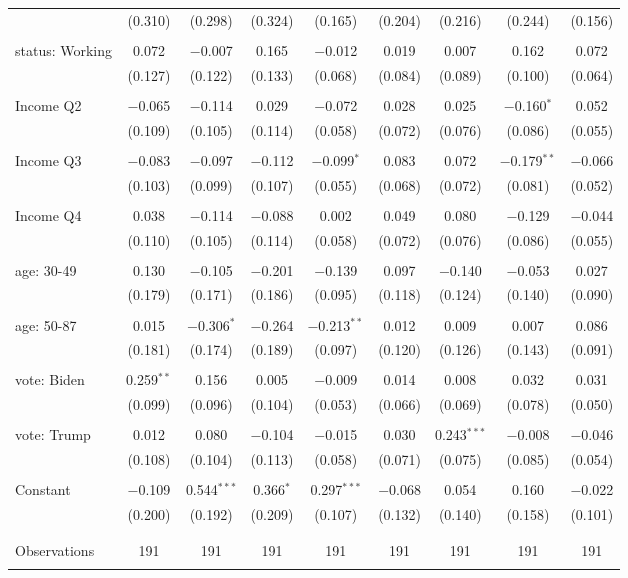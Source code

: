 \begin{tabular}{@{\extracolsep{5pt}}lcccccccc}
  & (0.310) & (0.298) & (0.324) & (0.165) & (0.204) & (0.216) & (0.244) & (0.156) \\ 
  & & & & & & & & \\ 
 status: Working & 0.072 & $-$0.007 & 0.165 & $-$0.012 & 0.019 & 0.007 & 0.162 & 0.072 \\ 
  & (0.127) & (0.122) & (0.133) & (0.068) & (0.084) & (0.089) & (0.100) & (0.064) \\ 
  & & & & & & & & \\ 
 Income Q2 & $-$0.065 & $-$0.114 & 0.029 & $-$0.072 & 0.028 & 0.025 & $-$0.160$^{*}$ & 0.052 \\ 
  & (0.109) & (0.105) & (0.114) & (0.058) & (0.072) & (0.076) & (0.086) & (0.055) \\ 
  & & & & & & & & \\ 
 Income Q3 & $-$0.083 & $-$0.097 & $-$0.112 & $-$0.099$^{*}$ & 0.083 & 0.072 & $-$0.179$^{**}$ & $-$0.066 \\ 
  & (0.103) & (0.099) & (0.107) & (0.055) & (0.068) & (0.072) & (0.081) & (0.052) \\ 
  & & & & & & & & \\ 
 Income Q4 & 0.038 & $-$0.114 & $-$0.088 & 0.002 & 0.049 & 0.080 & $-$0.129 & $-$0.044 \\ 
  & (0.110) & (0.105) & (0.114) & (0.058) & (0.072) & (0.076) & (0.086) & (0.055) \\ 
  & & & & & & & & \\ 
 age: 30-49 & 0.130 & $-$0.105 & $-$0.201 & $-$0.139 & 0.097 & $-$0.140 & $-$0.053 & 0.027 \\ 
  & (0.179) & (0.171) & (0.186) & (0.095) & (0.118) & (0.124) & (0.140) & (0.090) \\ 
  & & & & & & & & \\ 
 age: 50-87 & 0.015 & $-$0.306$^{*}$ & $-$0.264 & $-$0.213$^{**}$ & 0.012 & 0.009 & 0.007 & 0.086 \\ 
  & (0.181) & (0.174) & (0.189) & (0.097) & (0.120) & (0.126) & (0.143) & (0.091) \\ 
  & & & & & & & & \\ 
 vote: Biden & 0.259$^{**}$ & 0.156 & 0.005 & $-$0.009 & 0.014 & 0.008 & 0.032 & 0.031 \\ 
  & (0.099) & (0.096) & (0.104) & (0.053) & (0.066) & (0.069) & (0.078) & (0.050) \\ 
  & & & & & & & & \\ 
 vote: Trump & 0.012 & 0.080 & $-$0.104 & $-$0.015 & 0.030 & 0.243$^{***}$ & $-$0.008 & $-$0.046 \\ 
  & (0.108) & (0.104) & (0.113) & (0.058) & (0.071) & (0.075) & (0.085) & (0.054) \\ 
  & & & & & & & & \\ 
 Constant & $-$0.109 & 0.544$^{***}$ & 0.366$^{*}$ & 0.297$^{***}$ & $-$0.068 & 0.054 & 0.160 & $-$0.022 \\ 
  & (0.200) & (0.192) & (0.209) & (0.107) & (0.132) & (0.140) & (0.158) & (0.101) \\ 
  & & & & & & & & \\ 
\hline \\[-1.8ex] 

Observations & 191 & 191 & 191 & 191 & 191 & 191 & 191 & 191 \\ 
\hline 
\hline \\[-1.8ex] 
\end{tabular} 